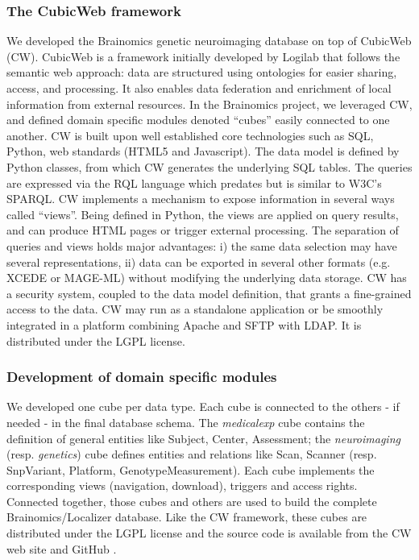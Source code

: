 \documentclass[review]{elsarticle}
\begin{document}
\subsubsection{The CubicWeb framework} We developed the Brainomics genetic neuroimaging database on top of CubicWeb (CW). CubicWeb is a framework initially developed by Logilab that follows the semantic web approach: data are structured using ontologies for easier sharing, access, and processing. It also enables data federation and enrichment of local information from external resources. In the Brainomics project, we leveraged CW, and defined domain specific modules denoted ``cubes'' easily connected to one another. CW is built upon well established core technologies such as SQL, Python, web standards (HTML5 and Javascript). The data model is defined by Python classes, from which CW generates the underlying SQL tables. The queries are expressed via the RQL language which predates but is similar to W3C's SPARQL. CW implements a mechanism to expose information in several ways called ``views''. Being defined in Python, the views are applied on query results, and can produce HTML pages or trigger external processing. The separation of queries and views holds major advantages: i) the same data selection may have several representations, ii) data can be exported in several other formats (e.g. XCEDE or MAGE-ML) without modifying the underlying data storage. CW has a security system, coupled to the data model definition, that grants a fine-grained access to the data. CW may run as a standalone application or be smoothly integrated in a platform combining Apache and SFTP with LDAP.  It is distributed under the LGPL license.


\subsubsection{Development of domain specific modules}

We developed one cube per data type. Each cube is connected to the others - if needed - in the final database schema. The \textit{medicalexp} cube contains the definition of general entities like Subject, Center, Assessment; the \textit{neuroimaging} (resp. \textit{genetics}) cube defines entities and relations like Scan, Scanner (resp. SnpVariant, Platform, GenotypeMeasurement). Each cube implements the corresponding views (navigation, download), triggers and access rights. Connected together, those cubes and others are used to build the complete Brainomics/Localizer database. Like the CW framework, these cubes are distributed under the LGPL license and the source code is available from the CW web site \cite{CubicWeb} and GitHub \cite{Localizer}.
\end{document}
